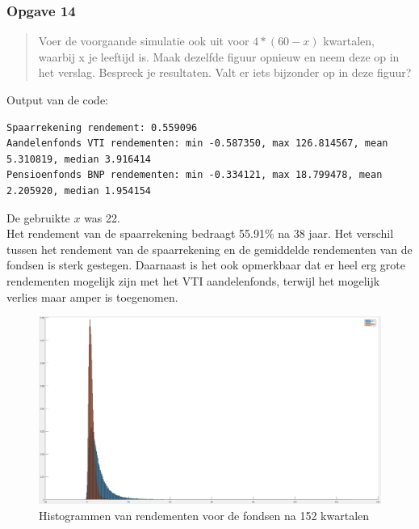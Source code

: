 \documentclass[11pt, a4paper, titlepage, openright]{article}
\begin{document}
	\newpage
	\subsubsection{Opgave 14}
		\begin{quote}
			Voer de voorgaande simulatie ook uit voor \( 4 * (60 - x) \) kwartalen, waarbij x je leeftijd is.
			Maak dezelfde figuur opnieuw en neem deze op in het verslag. Bespreek je resultaten. Valt er iets bijzonder op in deze figuur?
		\end{quote}
		
		\noindent Output van de code:
\begin{lstlisting}
Spaarrekening rendement: 0.559096
Aandelenfonds VTI rendementen: min -0.587350, max 126.814567, mean 5.310819, median 3.916414
Pensioenfonds BNP rendementen: min -0.334121, max 18.799478, mean 2.205920, median 1.954154\end{lstlisting}
		De gebruikte \( x \) was 22. \\
		Het rendement van de spaarrekening bedraagt 55.91\% na 38 jaar. Het verschil tussen het rendement van de spaarrekening en de 
		gemiddelde rendementen van de fondsen is sterk gestegen. Daarnaast is het ook opmerkbaar dat er heel erg grote rendementen mogelijk
		zijn met het VTI aandelenfonds, terwijl het mogelijk verlies maar amper is toegenomen.
				
		
		\begin{figure}[H]
			\centering
			\includegraphics[width=1\linewidth]{../ex14-backup}
			\caption{Histogrammen van rendementen voor de fondsen na 152 kwartalen}
			\label{fig:ex14}
		\end{figure}
		

		
\end{document}

